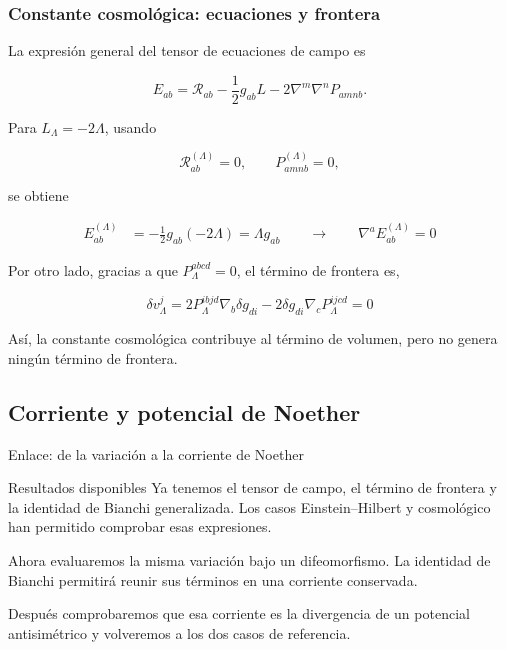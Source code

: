 \documentclass{beamer}
\begin{document}
\begin{frame}[label=nav-frame-039]
\frametitle{Constante cosmológica: ecuaciones y frontera}
\small

La expresión general del tensor de ecuaciones de campo es

\[
E_{ab}
=
\mathcal{R}_{ab}
-\frac12 g_{ab}L
-2\nabla^m\nabla^nP_{amnb}.
\]

Para \(L_{\Lambda}=-2\Lambda\), usando

\[
\mathcal{R}_{ab}^{(\Lambda)}=0,
\qquad
P_{amnb}^{(\Lambda)}=0,
\]

se obtiene

\begin{align*}
E_{ab}^{(\Lambda)}
&=
-\frac12g_{ab}(-2\Lambda)
=
\Lambda g_{ab}
\qquad
\longrightarrow
\qquad
\nabla^a E^{(\Lambda)}_{ab} = 0
\end{align*}

Por otro lado, gracias a que \(P_{\Lambda}^{abcd}=0\), el término de frontera es,

\[
\delta v_{\Lambda}^{j}
=
2P_{\Lambda}^{ibjd}\nabla_b\delta g_{di}
-
2\delta g_{di}\nabla_cP_{\Lambda}^{ijcd}=0
\]

Así, la constante cosmológica contribuye al término de volumen,
pero no genera ningún término de frontera.

\end{frame}




\subsection{Corriente y potencial de Noether}

\begin{frame}[label=nav-frame-041]{Enlace: de la variación a la corriente de Noether}
\small
\begin{block}{Resultados disponibles}
Ya tenemos el tensor de campo, el término de frontera y la identidad
de Bianchi generalizada. Los casos Einstein--Hilbert y cosmológico
han permitido comprobar esas expresiones.
\end{block}

\medskip
Ahora evaluaremos la misma variación bajo un difeomorfismo.
La identidad de Bianchi permitirá reunir sus términos en una
corriente conservada.

\medskip
Después comprobaremos que esa corriente es la divergencia de un
potencial antisimétrico y volveremos a los dos casos de referencia.
\end{frame}
\end{document}
